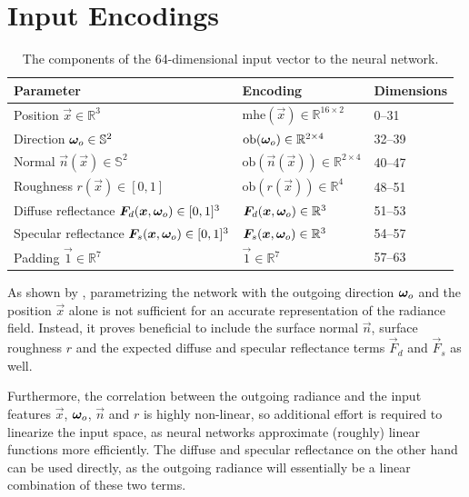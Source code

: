 \section{Input Encodings}
\begin{table}
    \centering
    \begin{tabular}{l l l}
        \textbf{Parameter} & \textbf{Encoding} & \textbf{Dimensions} \\
        \midrule
        Position $\vec{x} \in \mathbb{R}^3$ & $\mathrm{mhe}(\vec{x}) \in \mathbb{R}^{16 \times 2}$ & 0--31 \\
        Direction ${\bm{\omega}_o} \in \mathbb{S}^2$ & $\mathrm{ob}({\bm{\omega}_o}) \in \mathbb{R}^{2 \times 4}$ & 32--39 \\
        Normal $\vec{n}(\vec{x}) \in \mathbb{S}^2$ & $\mathrm{ob}(\vec{n}(\vec{x})) \in \mathbb{R}^{2 \times 4}$ & 40--47 \\
        Roughness $r(\vec{x}) \in [0,1]$ & $\mathrm{ob}(r(\vec{x})) \in \mathbb{R}^{4}$ & 48--51 \\
        Diffuse reflectance $\bm{F}_d(\bm{x}, {\bm{\omega}_o}) \in [0,1]^3$ & $\bm{F}_d(\bm{x}, {\bm{\omega}_o}) \in \mathbb{R}^{3}$ & 51--53 \\
        Specular reflectance $\bm{F}_s(\bm{x}, {\bm{\omega}_o}) \in [0,1]^3$ & $\bm{F}_s(\bm{x}, {\bm{\omega}_o}) \in \mathbb{R}^{3}$ & 54--57 \\
        Padding $\vec{1} \in \mathbb{R}^7$ & $\vec{1} \in \mathbb{R}^7$ & 57--63 \\ %
    \end{tabular}
    \caption{The components of the 64-dimensional input vector to the neural network.}
    \label{tab:input-encoding}
\end{table}
As shown by \textcite{ren2013}, parametrizing the network with the outgoing direction ${\bm{\omega}_o}$ and the position $\vec{x}$ alone is not sufficient for an accurate representation of the radiance field.
Instead, it proves beneficial to include the surface normal $\vec{n}$, surface roughness $r$ and the expected diffuse and specular reflectance terms $\vec{F}_d$ and $\vec{F}_s$ as well.

Furthermore, the correlation between the outgoing radiance and the input features $\vec{x}$, ${\bm{\omega}_o}$, $\vec{n}$ and $r$ is highly non-linear, so additional effort is required to linearize the input space, as neural networks approximate (roughly) linear functions more efficiently.
The diffuse and specular reflectance on the other hand can be used directly, as the outgoing radiance will essentially be a linear combination of these two terms.

